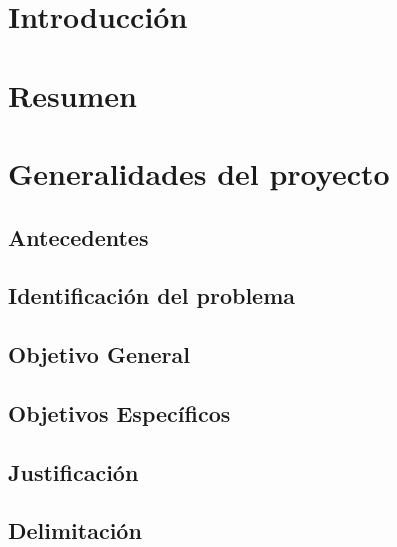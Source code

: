 \documentclass{extbook}
\begin{document}






\tableofcontents
\listoffigures
\listoftables

\chapter{Introducción}
% 
\chapter{Resumen}

\chapter{Generalidades del proyecto}
  \section{Antecedentes}
    
    
    
  \section{Identificación del problema}
    
  \section{Objetivo General}
    
  \section{Objetivos Específicos}
    
  \section{Justificación}
    
  \section{Delimitación}
    

\end{document}
